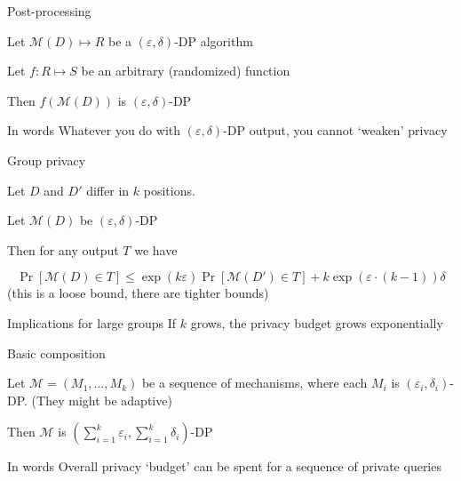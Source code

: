 \documentclass[12pt,aspectratio=169,handout]{beamer}
\begin{document}
\begin{frame}{Post-processing}

Let $\mathcal{M}(D) \mapsto R$ be a $(\varepsilon, \delta)$-DP algorithm

Let $f: R \mapsto S$ be an arbitrary (randomized) function

Then $f(\mathcal{M}(D))$ is $(\varepsilon, \delta)$-DP

\begin{block}{In words}
Whatever you do with $(\varepsilon, \delta)$-DP output, you cannot `weaken' privacy
\end{block}


\end{frame}


\begin{frame}{Group privacy}

Let $D$ and $D'$ differ in $k$ positions.

Let $\mathcal{M}(D)$ be $(\varepsilon, \delta)$-DP

Then for any output $T$ we have

$$
\Pr[\mathcal{M}(D) \in T] \leq \exp(k \varepsilon) \Pr[\mathcal{M}(D') \in T] +
k \exp(\varepsilon \cdot (k - 1))
\delta
$$
(this is a loose bound, there are tighter bounds)

\begin{block}{Implications for large groups}
If $k$ grows, the privacy budget grows exponentially
\end{block}

\end{frame}


\begin{frame}{Basic composition}

Let $\mathcal{M} = (M_1, \ldots, M_k)$ be a sequence of mechanisms, where each $M_i$ is $(\varepsilon_i, \delta_i)$-DP. (They might be adaptive)

Then $\mathcal{M}$ is $(\sum_{i = 1}^{k} \varepsilon_i, \sum_{i = 1}^{k} \delta_i )$-DP

\begin{block}{In words}
Overall privacy `budget' can be spent for a sequence of private queries
\end{block}

\end{frame}
\end{document}
